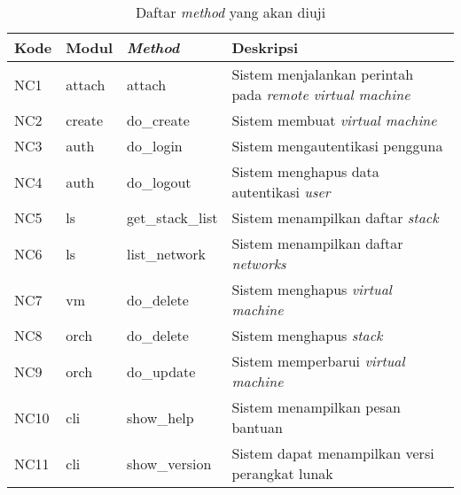 \begin{longtable}[c]{|l|l|p{2.5cm}|p{7cm}|}
  \caption{Daftar \emph{method} yang akan diuji} \label{tab:method-yang-diuji} \\
  \hline
  \textbf{Kode} & \textbf{Modul} & \textbf{\emph{Method}} & \textbf{Deskripsi} \\
  \hline
  \endhead %
  NC1 & attach & attach & Sistem menjalankan perintah
                                       pada \emph{remote virtual machine}\\\hline
  NC2 & create & do\_create & Sistem membuat \emph{virtual machine} \\\hline
  NC3 & auth & do\_login & Sistem mengautentikasi pengguna \\\hline
  NC4 & auth & do\_logout & Sistem menghapus data autentikasi \emph{user}\\\hline
  NC5 & ls & get\_stack\_list & Sistem menampilkan daftar \emph{stack} \\\hline
  NC6 & ls & list\_network & Sistem menampilkan daftar \emph{networks} \\\hline
  NC7 & vm & do\_delete & Sistem menghapus \emph{virtual machine}\\\hline
  NC8 & orch & do\_delete & Sistem menghapus \emph{stack}\\\hline
  NC9 & orch & do\_update & Sistem memperbarui \emph{virtual machine}\\\hline
  NC10 & cli & show\_help & Sistem menampilkan pesan bantuan \\\hline
  NC11 & cli & show\_version & Sistem dapat menampilkan versi perangkat lunak \\\hline
\end{longtable}


